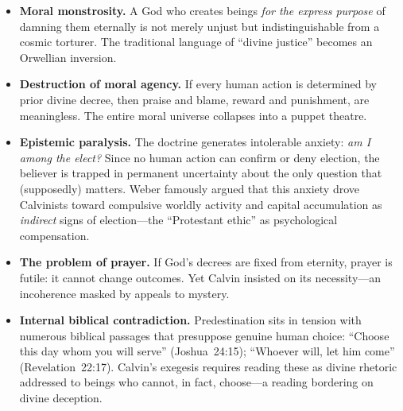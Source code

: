 \documentclass[11pt,twoside]{article}
\begin{document}
\begin{scheda}

\begin{itemize}
  \item \textbf{Moral monstrosity.}
    A God who creates beings \emph{for the express purpose} of damning them
    eternally is not merely unjust but indistinguishable from a cosmic
    torturer.  The traditional language of ``divine justice'' becomes an
    Orwellian inversion.

  \item \textbf{Destruction of moral agency.}
    If every human action is determined by prior divine decree, then praise
    and blame, reward and punishment, are meaningless.  The entire moral
    universe collapses into a puppet theatre.

  \item \textbf{Epistemic paralysis.}
    The doctrine generates intolerable anxiety: \emph{am I among the elect?}
    Since no human action can confirm or deny election, the believer is
    trapped in permanent uncertainty about the only question that
    (supposedly) matters.  Weber famously argued that this
    anxiety drove Calvinists toward compulsive worldly activity and
    capital accumulation as \emph{indirect} signs of election---the
    ``Protestant ethic'' as psychological
    compensation.

  \item \textbf{The problem of prayer.}
    If God's decrees are fixed from eternity, prayer is futile: it cannot
    change outcomes.  Yet Calvin insisted on its necessity---an incoherence
    masked by appeals to mystery.

  \item \textbf{Internal biblical contradiction.}
    Predestination sits in tension with numerous biblical passages that
    presuppose genuine human choice:
    ``Choose this day whom you will serve'' (Joshua~24:15);
    ``Whoever will, let him come'' (Revelation~22:17).
    Calvin's exegesis requires reading these as divine rhetoric addressed
    to beings who cannot, in fact, choose---a reading bordering on divine
    deception.
\end{itemize}
\end{scheda}
\end{document}
